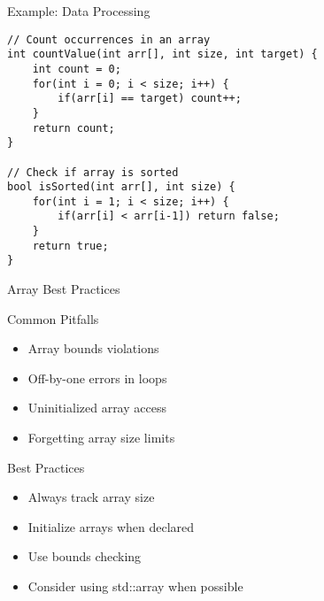 \documentclass{beamer}
\begin{document}
\begin{frame}[fragile]{Example: Data Processing}
    \begin{lstlisting}
// Count occurrences in an array
int countValue(int arr[], int size, int target) {
    int count = 0;
    for(int i = 0; i < size; i++) {
        if(arr[i] == target) count++;
    }
    return count;
}

// Check if array is sorted
bool isSorted(int arr[], int size) {
    for(int i = 1; i < size; i++) {
        if(arr[i] < arr[i-1]) return false;
    }
    return true;
}
    \end{lstlisting}
\end{frame}

\begin{frame}{Array Best Practices}
    \begin{alertblock}{Common Pitfalls}
        \begin{itemize}
            \item Array bounds violations
            \item Off-by-one errors in loops
            \item Uninitialized array access
            \item Forgetting array size limits
        \end{itemize}
    \end{alertblock}
    
    \begin{block}{Best Practices}
        \begin{itemize}
            \item Always track array size
            \item Initialize arrays when declared
            \item Use bounds checking
            \item Consider using std::array when possible
        \end{itemize}
    \end{block}
\end{frame}
\end{document}
